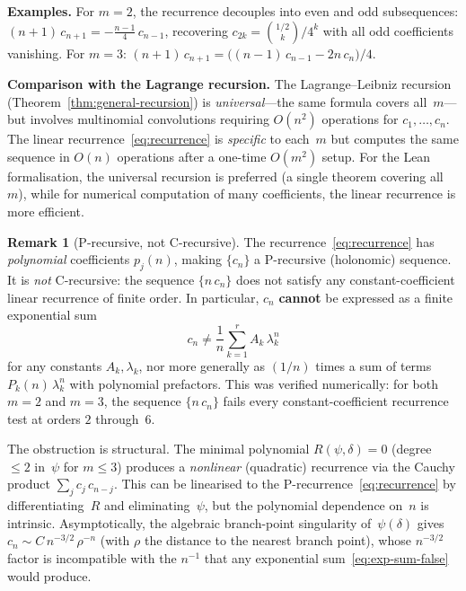 \documentclass[11pt,a4paper]{article}
\theoremstyle{plain}
\theoremstyle{definition}
\newtheorem{remark}[theorem]{Remark}
\begin{document}
\smallskip
\noindent\textbf{Examples.}
For $m = 2$, the recurrence decouples into even and odd subsequences:
$(n+1)\,c_{n+1} = -\tfrac{n-1}{4}\,c_{n-1}$, recovering
$c_{2k} = \binom{1/2}{k}/4^k$ with all odd coefficients vanishing.
For $m = 3$: $(n+1)\,c_{n+1} = \bigl((n-1)\,c_{n-1} - 2n\,c_n\bigr)/4$.

\smallskip
\noindent\textbf{Comparison with the Lagrange recursion.}
The Lagrange--Leibniz recursion (Theorem~\ref{thm:general-recursion}) is
\emph{universal}---the same formula covers all~$m$---but involves
multinomial convolutions requiring $O(n^2)$ operations for $c_1, \ldots, c_n$.
The linear recurrence~\eqref{eq:recurrence} is \emph{specific} to each~$m$
but computes the same sequence in $O(n)$ operations after a one-time
$O(m^2)$ setup.  For the Lean formalisation, the universal recursion is
preferred (a single theorem covering all~$m$), while for numerical
computation of many coefficients, the linear recurrence is more efficient.

\begin{remark}[P-recursive, not C-recursive]
\label{rem:not-c-recursive}
The recurrence~\eqref{eq:recurrence} has \emph{polynomial} coefficients
$p_j(n)$, making $\{c_n\}$ a P-recursive (holonomic) sequence.  It is
\emph{not} C-recursive: the sequence $\{n\,c_n\}$ does not satisfy any
constant-coefficient linear recurrence of finite order.  In particular,
$c_n$ \textbf{cannot} be expressed as a finite exponential sum
\begin{equation}\label{eq:exp-sum-false}
  c_n \neq \frac{1}{n}\sum_{k=1}^r A_k\,\lambda_k^n
\end{equation}
for any constants $A_k, \lambda_k$, nor more generally as $(1/n)$ times
a sum of terms $P_k(n)\,\lambda_k^n$ with polynomial prefactors.
This was verified numerically: for both $m=2$ and $m=3$, the
sequence $\{n\,c_n\}$ fails every constant-coefficient recurrence test
at orders $2$ through~$6$.

The obstruction is structural.  The minimal polynomial
$R(\psi, \delta) = 0$ (degree~$\le 2$ in~$\psi$ for $m \le 3$) produces
a \emph{nonlinear} (quadratic) recurrence via the Cauchy product
$\sum_{j} c_j\,c_{n-j}$.  This can be linearised to the
P-recurrence~\eqref{eq:recurrence} by differentiating~$R$ and
eliminating~$\psi$, but the polynomial dependence on~$n$ is intrinsic.
Asymptotically, the algebraic branch-point singularity of~$\psi(\delta)$
gives $c_n \sim C\,n^{-3/2}\,\rho^{-n}$ (with $\rho$ the distance to
the nearest branch point), whose $n^{-3/2}$ factor is incompatible
with the $n^{-1}$ that any exponential sum~\eqref{eq:exp-sum-false}
would produce.
\end{remark}
\end{document}
